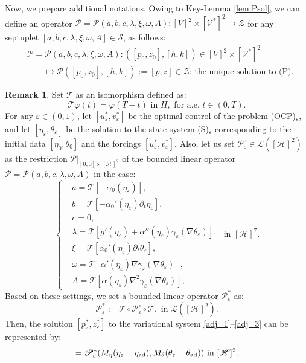 \documentclass{sinst}
\numberwithin{equation}{section}
\theoremstyle{plain}
\theoremstyle{definition}
\newtheorem{rem}{Remark}
\def\sH{\mathscr{H}}
\def\sL{\mathscr{L}}
\def\sP{\mathscr{P}}
\def\sS{\mathscr{S}}
\def\sT{\mathscr{T}}
\def\sV{\mathscr{V}}
\def\sZ{\mathscr{Z}}
\begin{document}
Now, we prepare additional notations. Owing to Key-Lemma \ref{lem:Psol}, we can define an operator $\sP = \sP(a,b,c,\lambda,\xi,\omega,A):[V]^2 \times [\sV^*]^2 \longrightarrow \sZ$ for any septuplet $[a,b,c,\lambda,\xi,\omega,A] \in \sS$, as follows:
\begin{align}
  &\sP = \sP(a,b,c,\lambda,\xi,\omega,A):([p_0, z_0],[h,k]) \in [V]^2 \times [\sV^*]^2 
  \\
  &\qquad \mapsto \sP([p_0, z_0],[h,k]) := [p,z] \in \sZ\mbox{: the unique solution to (P)}. \label{sol_op_P}
\end{align}

\begin{rem} \label{rem:p*}
  Set $\sT$ as an isomorphism defined as:
  \begin{equation}
    \sT \varphi(t) = \varphi(T-t) \mbox{ in } H, \mbox{ for a.e. } t \in (0,T).
  \end{equation}
  For any $\varepsilon \in (0,1)$, let $[u_\varepsilon^*, v_\varepsilon^*]$ be the optimal control of the problem (OCP)$_\varepsilon$, and let $[\eta_\varepsilon,\theta_\varepsilon]$ be the solution to the state system (S)$_\varepsilon$ corresponding to the initial data $[\eta_0, \theta_0]$ and the forcings $[u_\varepsilon^*, v_\varepsilon^*]$. Also, let us set $\sP_\varepsilon^\circ \in \sL([\sH]^2)$ as the restriction $\sP|_{[0,0] \times [\sH]^2}$ of the bounded linear operator $\sP = \sP(a,b,c,\lambda,\omega,A)$ in the case:
  \begin{equation}
    \left\{ \begin{aligned}
      &a = \sT[-\alpha_0(\eta_\varepsilon)],
      \\
      &b = \sT[-\alpha_0'(\eta_\varepsilon)\partial_t \eta_\varepsilon],
      \\
      &c = 0,
      \\
      &\lambda = \sT[g'(\eta_\varepsilon) + \alpha''(\eta_\varepsilon) \gamma_\varepsilon(\nabla \theta_\varepsilon)],
      \\
      &\xi = \sT[\alpha_0'(\eta_\varepsilon) \partial_t \theta_\varepsilon],
      \\
      &\omega = \sT[\alpha'(\eta_\varepsilon) \nabla \gamma_\varepsilon(\nabla \theta_\varepsilon)],
      \\
      &A = \sT[\alpha(\eta_\varepsilon) \nabla^2 \gamma_\varepsilon(\nabla \theta_\varepsilon)],
    \end{aligned} \right. \mbox{ in } [\sH]^7.
  \end{equation}
  Based on these settings, we set a bounded linear operator $\sP_\varepsilon^*$ as:
  \begin{equation}
    \sP_\varepsilon^* := \sT \circ \sP_\varepsilon^\circ \circ \sT, \mbox{ in } \sL([\sH]^2).
  \end{equation}
  Then, the solution $[p_\varepsilon^*,z_\varepsilon^*]$ to the variational system \eqref{adj_1}--\eqref{adj_3} can be represented by:
  \begin{equation}
    [p_\varepsilon^*, z_\varepsilon^*] = \sP_\varepsilon^*(M_\eta(\eta_\varepsilon - \eta_{\rm ad}),M_\theta(\theta_\varepsilon - \theta_{\rm ad})) \mbox{ in } [\sH]^2.
  \end{equation}
\end{rem}
\end{document}
